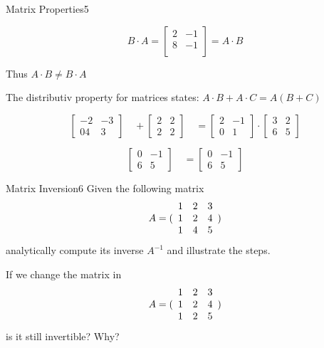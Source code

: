 \begin{questions}
\begin{question}{Matrix Properties}{5}
\begin{answer}
\begin{equation}
B \cdot A = \begin{bmatrix}
2 & -1 \\
8 & -1\\
\end{bmatrix} = A\cdot B
\end{equation}

Thus $A \cdot B \neq B \cdot A$

The distributiv property for matrices states: $A\cdot B + A\cdot C = A (B+C)$ 


\[
\begin{bmatrix}
-2 & -3  \\
04 &  3 
\end{bmatrix}\quad
+
\begin{bmatrix}
2 & 2  \\
2 & 2 
\end{bmatrix}\quad
=
\begin{bmatrix}
2 & -1  \\
0 & 1 
\end{bmatrix}
\cdot
\begin{bmatrix}
3 & 2  \\
6 & 5
\end{bmatrix}
\]

\[
\begin{bmatrix}
0 & -1  \\
6 & 5 
\end{bmatrix}\quad
=
\begin{bmatrix}
0 & -1  \\
6 & 5
\end{bmatrix}
\]


\end{answer}

\end{question}


\begin{question}{Matrix Inversion}{6}
Given the following matrix 
\begin{equation*}
     A = ( \begin{array}{c c c} 
     1 & 2 & 3 \\
     1 & 2 & 4 \\
     1 & 4 & 5 \end{array} )
\end{equation*}
analytically compute its inverse $ A^{-1}$ and illustrate the steps.

If we change the matrix in
\begin{equation*}
     A = ( \begin{array}{c c c} 
     1 & 2 & 3 \\
     1 & 2 & 4 \\
     1 & 2 & 5 \end{array} )
\end{equation*}
is it still invertible? Why?


\end{question}
\end{questions}
